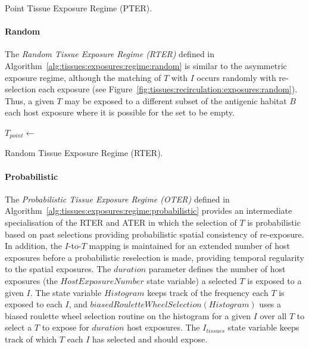 \begin{algorithm}[ht]	
	\SetLine		
	
	{
		\;
	}	
	\caption{Point Tissue Exposure Regime (PTER).}
	\label{alg:tissues:exposures:regime:point}
\end{algorithm}

%
%
\paragraph{Random}
The \emph{Random Tissue Exposure Regime (RTER)} defined in Algorithm~\ref{alg:tissues:exposures:regime:random} is similar to the asymmetric exposure regime, although the matching of $T$ with $I$ occurs randomly with re-selection each exposure (see Figure~\ref{fig:tissues:recirculation:exposures:random}). Thus, a given $T$ may be exposed to a different subset of the antigenic habitat $B$ each host exposure where it is possible for the set to be empty. 

\begin{algorithm}[ht]	
	\SetLine		
	\KwIn{\Host, \Habitat}	
	
	{
		$T_{point} \leftarrow$ \;
		\;
	}	
	\caption{Random Tissue Exposure Regime (RTER).}
	\label{alg:tissues:exposures:regime:random}
\end{algorithm}

%
%
\paragraph{Probabilistic}
The \emph{Probabilistic Tissue Exposure Regime (OTER)} defined in Algorithm~\ref{alg:tissues:exposures:regime:probabilistic} provides an intermediate specialisation of the RTER and ATER in which the selection of $T$ is probabilistic based on past selections providing probabilistic spatial consistency of re-exposure. In addition, the $I$-to-$T$ mapping is maintained for an extended number of host exposures before a probabilistic reselection is made, providing temporal regularity to the spatial exposures. The $duration$ parameter defines the number of host exposures (the $HostExposureNumber$ state variable) a selected $T$ is exposed to a given $I$. The state variable $Histogram$ keeps track of the frequency each $T$ is exposed to each $I$, and $biasedRouletteWheelSelection(Histogram)$ uses a biased roulette wheel selection routine on the histogram for a given $I$ over all $T$ to select a $T$ to expose for $duration$ host exposures. The $I_{tissues}$ state variable keeps track of which $T$ each $I$ has selected and should expose.

